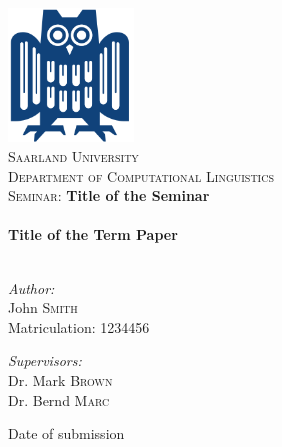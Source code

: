\begin{titlepage}
\begin{center}

\includegraphics[width=0.25\textwidth]{./eule}~\\[1cm]

\textsc{\LARGE Saarland  University}\\[0.4cm]
\textsc{\Large Department of Computational Linguistics}\\[1.5cm]

\textsc{\Large Seminar:} \textbf{\Large Title of the Seminar}\\[0.5cm]

\HRule \\[1.0cm]

{ \huge \bfseries Title of the Term Paper}\\[0.4cm]

\HRule \\[1.5cm]

\begin{minipage}{0.4\textwidth}
\begin{flushleft} \large
\emph{Author:}\\
John \textsc{Smith}\\
Matriculation: 1234456
\end{flushleft}
\end{minipage}
\begin{minipage}{0.4\textwidth}
\begin{flushright} \large
\emph{Supervisors:} \\
Dr. Mark \textsc{Brown}\\
Dr. Bernd \textsc{Marc}\\
\end{flushright}
\end{minipage}

\vfill

{\large Date of submission}

\end{center}
\end{titlepage}
